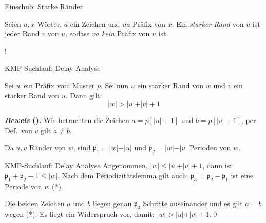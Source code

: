 \documentclass[xcolor=dvipsnames, aspectratio=169]{beamer}
\begin{document}
\begin{frame}{Einschub: Starke Ränder}
\begin{defi}
Seien $u,x$ Wörter, $a$ ein Zeichen und $ua$ Präfix von $x$. Ein \emph{starker Rand} von $u$ ist jeder Rand $v$ von $u$, sodass $va$ \emph{kein} Präfix von $u$ ist.
\end{defi}
\pause\bigskip

\begin{center}
 {!} {
}
\end{center}
\end{frame}

\begin{frame}{KMP-Suchlauf: Delay Analyse}
\begin{lemm}\label{lem:stark}
Sei $w$ ein Präfix vom Muster $p$. Sei nun $u$ ein starker Rand von $w$ und $v$ ein starker Rand von $u$. Dann gilt: \[\vert w\vert > \vert u\vert +\vert v\vert +1\]
\end{lemm}\bigskip\pause

\textbf{\textit{Beweis} (\cite{purdue}).} Wir betrachten die Zeichen $a=p[\vert u\vert+1]$ und $b=p[\vert v\vert+1]$, per Def.\ von $v$ gilt $a\neq b$.\medskip

Da $u,v$ Ränder von $w$, sind $\mathfrak{p}_1=\vert w\vert -\vert u\vert$ und $\mathfrak{p}_2=\vert w\vert -\vert v\vert$ Perioden von $w$.
\end{frame}\medskip

\begin{frame}{KMP-Suchlauf: Delay Analyse}
Angenommen, $\vert w\vert \leq \vert u\vert+\vert v\vert +1$, dann ist $\mathfrak{p}_1+\mathfrak{p}_2-1\leq \vert w\vert$. Nach dem Periodizitätslemma gilt auch: $\mathfrak{p}_3=\mathfrak{p}_2-\mathfrak{p}_1$ ist eine Periode von $w$ (*).\medskip

Die beiden Zeichen $a$ und $b$ liegen genau $\mathfrak{p}_3$ Schritte auseinander und es gilt $a=b$ wegen (*). Es liegt ein Widerspruch vor, damit: $\vert w\vert > \vert u\vert +\vert v\vert +1$.\qed
\end{frame}
\end{document}

